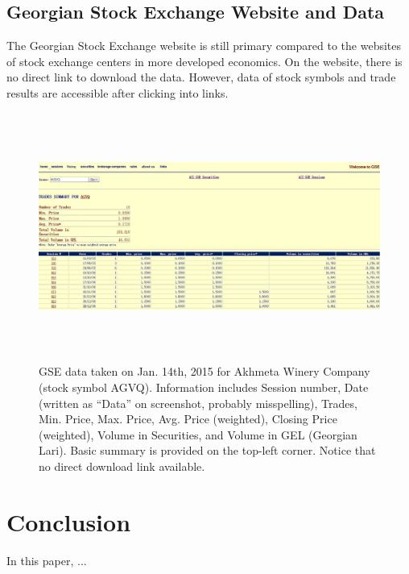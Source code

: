 \documentclass[a4paper]{article}
\begin{document}
\subsection{Georgian Stock Exchange Website and Data}
\label{sec:GSE}

The Georgian Stock Exchange website is still primary compared to the websites of stock exchange centers in more developed economics. On the website, there is no direct link to download the data. However, data of stock symbols and trade results are accessible after clicking into links.

\begin{figure}[H]
\centering
\includegraphics[width=6.3in, height=3.2in]{images/AGVQ.jpg}
\caption{GSE data taken on Jan. 14th, 2015 for Akhmeta Winery Company (stock symbol AGVQ). Information includes Session number, Date (written as ``Data'' on screenshot, probably misspelling), Trades, Min. Price, Max. Price, Avg. Price (weighted), Closing Price (weighted), Volume in Securities, and Volume in GEL (Georgian Lari). Basic summary is provided on the top-left corner. Notice that no direct download link available.}
\label{fig:AGVQ}
\end{figure}



\section{Conclusion}

In this paper, ...
\end{document}
